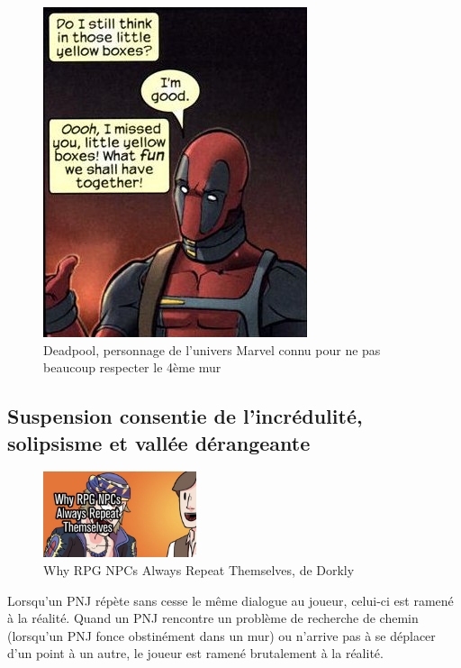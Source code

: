 \documentclass[a4paper, 12pt]{article} %
\begin{document}
\begin{figure}[!h]%
	\begin{center} 
		\includegraphics[width=0.60\columnwidth]{images/deadpool.png}%
		\caption{Deadpool, personnage de l’univers Marvel connu pour ne pas beaucoup respecter le 4ème mur}%
	\end{center}
\end{figure}

\newpage

\subsection{Suspension consentie de l'incrédulité, solipsisme et vallée dérangeante}

\begin{figure}
	\begin{center}
		\includegraphics[width=0.40\textwidth]{images/repeat1.png}
	\end{center}
	\caption{Why RPG NPCs Always Repeat Themselves, de Dorkly}
\end{figure}

Lorsqu’un PNJ répète sans cesse le même dialogue au joueur, celui-ci est ramené à la réalité. Quand un PNJ rencontre un problème de recherche de chemin (lorsqu’un PNJ fonce obstinément dans un mur) ou n’arrive pas à se déplacer d’un point à un autre, le joueur est ramené brutalement à la réalité. 
\end{document}
